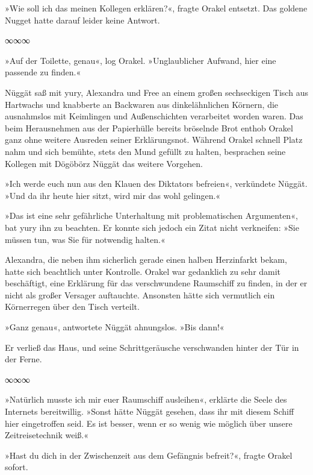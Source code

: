 »Wie soll ich das meinen Kollegen erklären?«, fragte Orakel entsetzt. Das goldene Nugget hatte darauf leider keine Antwort.

\begin{center}
∞∞∞
\end{center}

»Auf der Toilette, genau«, log Orakel. »Unglaublicher Aufwand, hier eine passende zu finden.«

Nüggät saß mit yury, Alexandra und Free an einem großen sechseckigen Tisch aus Hartwachs und knabberte an Backwaren aus dinkelähnlichen Körnern, die ausnahmslos mit Keimlingen und Außenschichten verarbeitet worden waren. Das beim Herausnehmen aus der Papierhülle bereits bröselnde Brot enthob Orakel ganz ohne weitere Ausreden seiner Erklärungsnot. Während Orakel schnell Platz nahm und sich bemühte, stets den Mund gefüllt zu halten, besprachen seine Kollegen mit Dögöbörz Nüggät das weitere Vorgehen.

»Ich werde euch nun aus den Klauen des Diktators befreien«, verkündete Nüggät. »Und da ihr heute hier sitzt, wird mir das wohl gelingen.«

»Das ist eine sehr gefährliche Unterhaltung mit problematischen Argumenten«, bat yury ihn zu beachten. Er konnte sich jedoch ein Zitat nicht verkneifen: »Sie müssen tun, was Sie für notwendig halten.«

Alexandra, die neben ihm sicherlich gerade einen halben Herzinfarkt bekam, hatte sich beachtlich unter Kontrolle. Orakel war gedanklich zu sehr damit beschäftigt, eine Erklärung für das verschwundene Raumschiff zu finden, in der er nicht als großer Versager auftauchte. Ansonsten hätte sich vermutlich ein Körnerregen über den Tisch verteilt.

»Ganz genau«, antwortete Nüggät ahnungslos. »Bis dann!«

Er verließ das Haus, und seine Schrittgeräusche verschwanden hinter der Tür in der Ferne.

\begin{center}
∞∞∞
\end{center}

»Natürlich musste ich mir euer Raumschiff ausleihen«, erklärte die Seele des Internets bereitwillig. »Sonst hätte Nüggät gesehen, dass ihr mit diesem Schiff hier eingetroffen seid. Es ist besser, wenn er so wenig wie möglich über unsere Zeitreisetechnik weiß.«

»Hast du dich in der Zwischenzeit aus dem Gefängnis befreit?«, fragte Orakel sofort.

